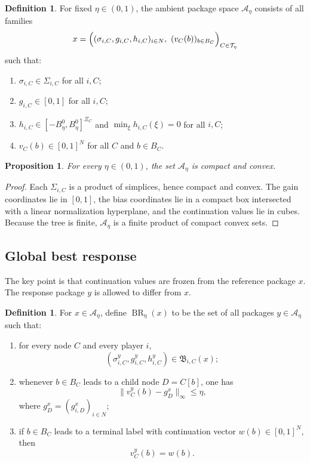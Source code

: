 \documentclass[12pt]{article}
\newtheorem{proposition}[theorem]{Proposition}
\theoremstyle{definition}
\newtheorem{definition}[theorem]{Definition}
\newcommand{\1}{\mathbf{1}}
\newcommand{\cA}{\mathcal{A}}
\newcommand{\cT}{\mathcal{T}}
\DeclareMathOperator{\BR}{BR}
\begin{document}
\begin{definition}
\label{def:Aeta}
For fixed $\eta\in(0,1)$, the ambient package space $\cA_\eta$ consists of all
families
\[
x=\Bigl((\sigma_{i,C},g_{i,C},h_{i,C})_{i\in N},\ (v_C(b))_{b\in B_C}\Bigr)_{C\in\cT_\eta}
\]
such that:
\begin{enumerate}[label=\textnormal{(A\arabic*)},leftmargin=2.8em]
\item $\sigma_{i,C}\in \Sigma_{i,C}$ for all $i,C$;
\item $g_{i,C}\in[0,1]$ for all $i,C$;
\item $h_{i,C}\in[-B_\eta^0,B_\eta^0]^{\Xi_C}$ and
$\min_{\xi}h_{i,C}(\xi)=0$ for all $i,C$;
\item $v_C(b)\in[0,1]^N$ for all $C$ and $b\in B_C$.
\end{enumerate}
\end{definition}

\begin{proposition}
\label{prop:Aeta-compact}
For every $\eta\in(0,1)$, the set $\cA_\eta$ is compact and convex.
\end{proposition}

\begin{proof}
Each $\Sigma_{i,C}$ is a product of simplices, hence compact and convex.  The gain
coordinates lie in $[0,1]$, the bias coordinates lie in a compact box intersected
with a linear normalization hyperplane, and the continuation values lie in cubes.
Because the tree is finite, $\cA_\eta$ is a finite product of compact convex sets.
\end{proof}

\subsection{Global best response}

The key point is that continuation values are frozen from the reference package
$x$.  The response package $y$ is allowed to differ from $x$.

\begin{definition}
\label{def:global-BR}
For $x\in\cA_\eta$, define $\BR_\eta(x)$ to be the set of all packages
$y\in\cA_\eta$ such that:
\begin{enumerate}[label=\textnormal{(G\arabic*)},leftmargin=2.8em]
\item for every node $C$ and every player $i$,
\[
(\sigma_{i,C}^y,g_{i,C}^y,h_{i,C}^y)\in \mathfrak B_{i,C}(x);
\]
\item whenever $b\in B_C$ leads to a child node $D=C[b]$, one has
\begin{equation}
\label{eq:frozen-continuation}
\|v_C^y(b)-g_D^x\|_\infty\le \eta,
\end{equation}
where $g_D^x=(g_{i,D}^x)_{i\in N}$;
\item if $b\in B_C$ leads to a terminal label with continuation vector
$w(b)\in[0,1]^N$, then
\[
v_C^y(b)=w(b).
\]
\end{enumerate}
\end{definition}
\end{document}
